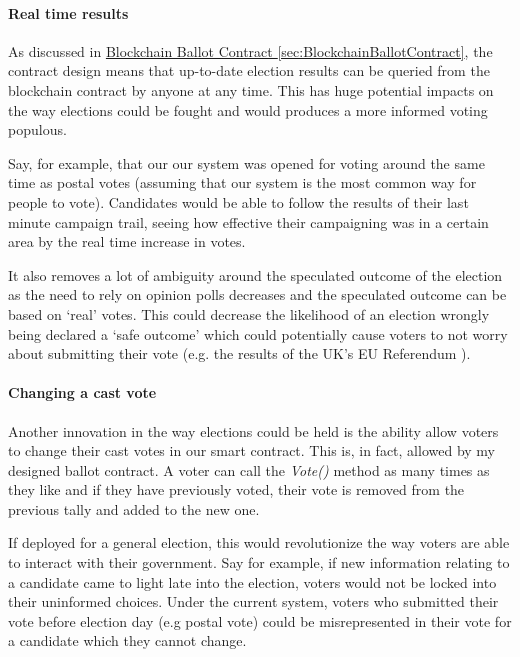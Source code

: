 \documentclass{article}
\begin{document}
\clearpage

\paragraph{Real time results}
\hfill \break
As discussed in \hyperref[sec:BlockchainBallotContract]{Blockchain Ballot Contract \ref*{sec:BlockchainBallotContract}}, the contract design means that up-to-date election results can be queried from the blockchain contract by anyone at any time. This has huge potential impacts on the way elections could be fought and would produces a more informed voting populous.

Say, for example, that our our system was opened for voting around the same time as postal votes (assuming that our system is the most common way for people to vote). Candidates would be able to follow the results of their last minute campaign trail, seeing how effective their campaigning was in a certain area by the real time increase in votes.

It also removes a lot of ambiguity around the speculated outcome of the election as the need to rely on opinion polls decreases and the speculated outcome can be based on `real' votes. This could decrease the likelihood of an election wrongly being declared a `safe outcome' which could potentially cause voters to not worry about submitting their vote (e.g. the results of the UK's EU Referendum \citep{68_curtice_2017}).

\paragraph{Changing a cast vote}
\hfill \break
Another innovation in the way elections could be held is the ability allow voters to change their cast votes in our smart contract. This is, in fact, allowed by my designed ballot contract. A voter can call the \textit{Vote()} method as many times as they like and if they have previously voted, their vote is removed from the previous tally and added to the new one.

If deployed for a general election, this would revolutionize the way voters are able to interact with their government. Say for example, if new information relating to a candidate came to light late into the election, voters would not be locked into their uninformed choices. Under the current system, voters who submitted their vote before election day (e.g postal vote) could be misrepresented in their vote for a candidate which they cannot change.
\end{document}
